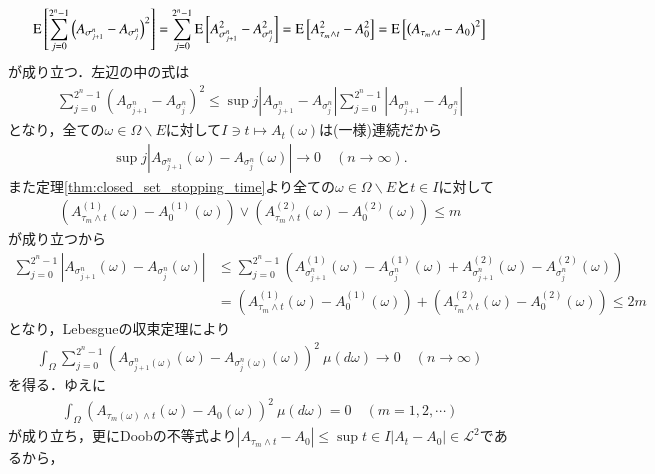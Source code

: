 \begin{prf}
{		}
		\begin{align}
			\operatorname{E} \left[ \sum_{j=0}^{2^n-1} \left( A_{\sigma_{j+1}^n} - A_{\sigma_j^n} \right)^2 \right]
			= \sum_{j=0}^{2^n-1} \operatorname{E} \left[ A_{\sigma_{j+1}^n}^2 - A_{\sigma_j^n}^2 \right]
			= \operatorname{E} \left[ A_{\tau_m \wedge t}^2 - A_{0}^2 \right]
			= \operatorname{E} \left[ \left( A_{\tau_m \wedge t} - A_{0} \right)^2 \right]
		\end{align}
		が成り立つ．左辺の中の式は
		\begin{align}
			\sum_{j=0}^{2^n-1} \left( A_{\sigma_{j+1}^n} - A_{\sigma_j^n} \right)^2
			\leq \sup{j}{\left| A_{\sigma_{j+1}^n} - A_{\sigma_j^n} \right|} \sum_{j=0}^{2^n-1} \left| A_{\sigma_{j+1}^n} - A_{\sigma_j^n} \right|
		\end{align}
		となり，全ての$\omega \in \Omega \backslash E$に対して$I \ni t \longmapsto A_t(\omega)$は(一様)連続だから
		\begin{align}
			\sup{j}{\left| A_{\sigma_{j+1}^n}(\omega) - A_{\sigma_j^n}(\omega) \right|} \longrightarrow 0 \quad (n \longrightarrow \infty).
		\end{align}
		また定理\ref{thm:closed_set_stopping_time}より全ての$\omega \in \Omega \backslash E$と$t \in I$に対して
		\begin{align}
			\left( A^{(1)}_{\tau_m \wedge t}(\omega) - A^{(1)}_0(\omega) \right) \vee \left( A^{(2)}_{\tau_m \wedge t}(\omega) - A^{(2)}_0(\omega) \right) \leq m
		\end{align}
		が成り立つから
		\begin{align}
			\sum_{j=0}^{2^n-1} \left| A_{\sigma_{j+1}^n}(\omega) - A_{\sigma_j^n}(\omega) \right|
			&\leq \sum_{j=0}^{2^n-1} \left( A^{(1)}_{\sigma_{j+1}^n}(\omega) - A^{(1)}_{\sigma_j^n}(\omega) + A^{(2)}_{\sigma_{j+1}^n}(\omega) - A^{(2)}_{\sigma_j^n}(\omega) \right) \\
			&= \left( A^{(1)}_{\tau_m \wedge t}(\omega) - A^{(1)}_0(\omega) \right) + \left( A^{(2)}_{\tau_m \wedge t}(\omega) - A^{(2)}_0(\omega) \right) \leq 2m
		\end{align}
		となり，Lebesgueの収束定理により
		\begin{align}
			\int_\Omega \sum_{j=0}^{2^n-1} \left( A_{\sigma_{j+1}^n(\omega)}(\omega) - A_{\sigma_j^n(\omega)}(\omega) \right)^2\ \mu(d\omega) \longrightarrow 0 \quad (n \longrightarrow \infty)
		\end{align}
		を得る．ゆえに
		\begin{align}
			\int_\Omega \left( A_{\tau_m(\omega) \wedge t}(\omega) - A_{0}(\omega) \right)^2\ \mu(d\omega) = 0 \quad (m=1,2,\cdots)
		\end{align}
		が成り立ち，更にDoobの不等式より$|A_{\tau_m \wedge t} - A_{0}| \leq \sup{t \in I}{|A_t - A_{0}|} \in \mathscr{L}^2$であるから，

\end{prf}
